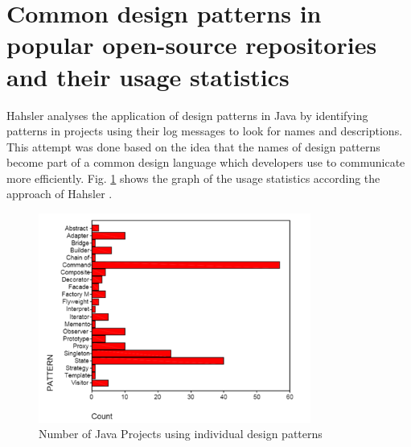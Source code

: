 \documentclass[sigplan,12pt,nonacm=true,review=false]{acmart}
\begin{document}
\section{Common design patterns in popular open-source repositories and their usage statistics}
Hahsler \cite{hahsler_quantitative_2003} analyses the application of design patterns in Java by identifying patterns in projects using their log messages to look for names and descriptions. This attempt was done based on the idea that the names of design patterns become part of a common design language which developers  use  to  communicate more  efficiently. Fig. \ref{fig:stats1} shows the graph of the usage statistics according the approach of Hahsler \cite{hahsler_quantitative_2003}.

\begin{figure}[!t]
  \includegraphics[width=0.8\textwidth]{eolang/tr-02/assets/Picture3.png}
  \caption{Number of Java Projects using individual design patterns \cite{hahsler_quantitative_2003}}
  \label{fig:stats1}
\end{figure}
\end{document}
